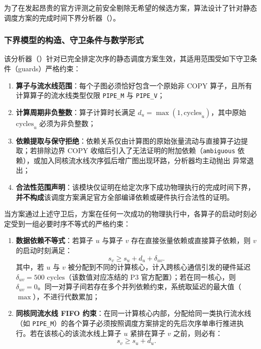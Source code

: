 \documentclass[anonymous,notoc]{gmcm2026}
\providecommand{\tightlist}{\setlength{\itemsep}{0pt}\setlength{\parskip}{0pt}}
\begin{document}
为了在发起昂贵的官方评测之前安全剔除无希望的候选方案，算法设计了针对静态调度方案的完成时间下界分析器（\texttt{}）。

\subsubsection{下界模型的构造、守卫条件与数学形式}

该分析器（\texttt{}）针对已完全排定次序的静态调度方案生效，其适用范围受如下守卫条件（guards）严格约束：

\begin{enumerate}
\def\labelenumi{\arabic{enumi}.}
\tightlist
\item
  \textbf{算子与流水线范围}：每个子图必须恰好包含一个原始非 COPY 算子，且所有计算算子的流水线类型仅限 \texttt{PIPE\_M} 与 \texttt{PIPE\_V}；
\item
  \textbf{计算周期非负整数}：算子计算时长满足 \(d_u = \max(1, \text{cycles}_u)\)，其中原始 \(\text{cycles}_u\) 必须为非负整数；
\item
  \textbf{依赖提取与保守拒绝}：依赖关系仅由计算图的原始张量流动与直接算子边提取；若排除边界 COPY 收缩后引入了无法证明的附加依赖（\texttt{ambiguous} 依赖），或加入同核流水线次序弧后增广图出现环路，分析器均主动抛出 \texttt{} 异常退出；
\item
  \textbf{合法性范围声明}：该模块仅证明在给定次序下成功物理执行的完成时间下界，\textbf{并不构成}该调度方案满足官方全部编译依赖或硬件执行合法性的证明。
\end{enumerate}

当方案通过上述守卫后，方案在任何一次成功的物理执行中，各算子的启动时刻必定受到一组必要时序不等式的严格约束：

\begin{enumerate}
\def\labelenumi{\arabic{enumi}.}
\tightlist
\item
  \textbf{数据依赖不等式}：若算子 \(u\) 与算子 \(v\) 存在直接张量依赖或直接算子依赖，则 \(v\) 的启动时刻满足： \begin{equation}
s_v \ge s_u + d_u + \delta_{uv}.
\end{equation} 其中，若 \(u\) 与 \(v\) 被分配到不同的计算核心，计入跨核心通信引发的硬件延迟 \(\delta_{uv} = 500\text{ cycles}\)（该数值对应冻结的 P3 官方配置）；若在同一核心，则 \(\delta_{uv} = 0\)。同一对算子间若存在多个并列依赖约束，系统取延迟的最大值（\(\max\)），不进行代数累加；
\item
  \textbf{同核同流水线 FIFO 约束}：在同一计算核心内部，分配给同一类执行流水线（如 \texttt{PIPE\_M}）的各个算子必须按照调度方案排定的先后次序单串行推进执行。若在该核心的该流水线上算子 \(u\) 紧排在算子 \(v\) 之前，则必有： \begin{equation}
s_v \ge s_u + d_u.
\end{equation}
\end{enumerate}
\end{document}
